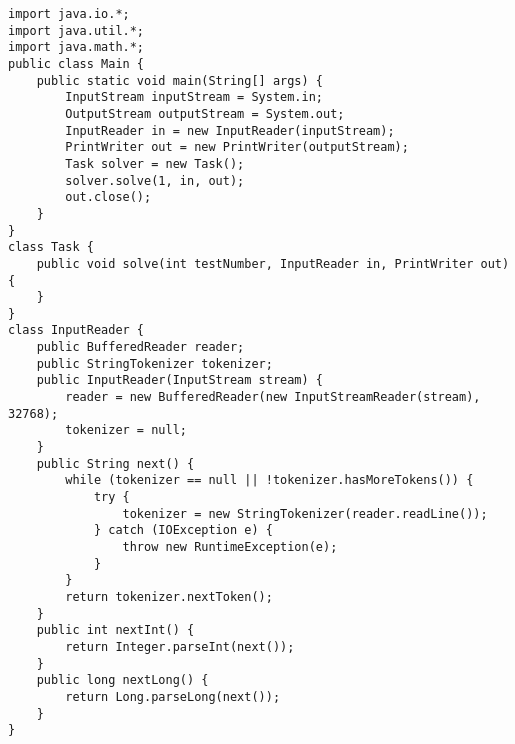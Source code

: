 \begin{lstlisting}
import java.io.*;
import java.util.*;
import java.math.*;
public class Main {
	public static void main(String[] args) {
		InputStream inputStream = System.in;
		OutputStream outputStream = System.out;
		InputReader in = new InputReader(inputStream);
		PrintWriter out = new PrintWriter(outputStream);
		Task solver = new Task();
		solver.solve(1, in, out);
		out.close();
	}
}
class Task {
	public void solve(int testNumber, InputReader in, PrintWriter out) {
	}
}
class InputReader {
	public BufferedReader reader;
	public StringTokenizer tokenizer;
	public InputReader(InputStream stream) {
		reader = new BufferedReader(new InputStreamReader(stream), 32768);
		tokenizer = null;
	}
	public String next() {
		while (tokenizer == null || !tokenizer.hasMoreTokens()) {
			try {
				tokenizer = new StringTokenizer(reader.readLine());
			} catch (IOException e) {
				throw new RuntimeException(e);
			}
		}
		return tokenizer.nextToken();
	}
	public int nextInt() {
		return Integer.parseInt(next());
	}
	public long nextLong() {
		return Long.parseLong(next());
	}
}
\end{lstlisting}
